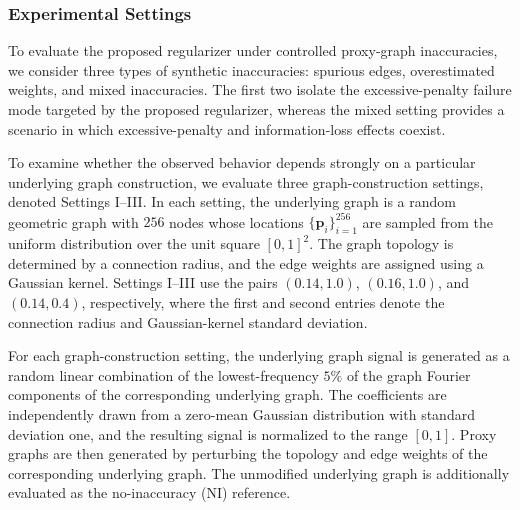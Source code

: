 \subsubsection{Experimental Settings}

To evaluate the proposed regularizer under controlled proxy-graph inaccuracies, we consider three types of synthetic inaccuracies: spurious edges, overestimated weights, and mixed inaccuracies.
The first two isolate the excessive-penalty failure mode targeted by the proposed regularizer, whereas the mixed setting provides a scenario in which excessive-penalty and information-loss effects coexist.

To examine whether the observed behavior depends strongly on a particular underlying graph construction, we evaluate three graph-construction settings, denoted Settings I--III.
In each setting, the underlying graph is a random geometric graph \cite{DallChristensen2002} with $256$ nodes whose locations $\{\mathbf{p}_i\}_{i=1}^{256}$ are sampled from the uniform distribution over the unit square $[0,1]^2$.
The graph topology is determined by a connection radius, and the edge weights are assigned using a Gaussian kernel.
Settings I--III use the pairs $(0.14,1.0)$, $(0.16,1.0)$, and $(0.14,0.4)$, respectively, where the first and second entries denote the connection radius and Gaussian-kernel standard deviation.

For each graph-construction setting, the underlying graph signal is generated as a random linear combination of the lowest-frequency $5\%$ of the graph Fourier components of the corresponding underlying graph.
The coefficients are independently drawn from a zero-mean Gaussian distribution with standard deviation one, and the resulting signal is normalized to the range $[0,1]$.
Proxy graphs are then generated by perturbing the topology and edge weights of the corresponding underlying graph.
The unmodified underlying graph is additionally evaluated as the no-inaccuracy (NI) reference.

